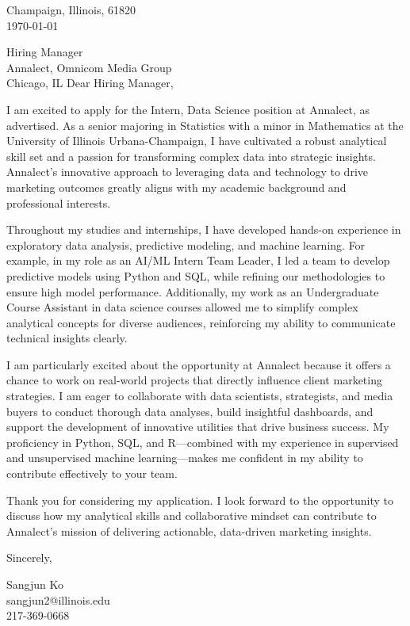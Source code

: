 \documentclass[11pt]{article}
\begin{document}
\noindent
Champaign, Illinois, 61820 \\
\today
\vspace{2em}

\noindent
Hiring Manager\\
Annalect, Omnicom Media Group\\
Chicago, IL
\vspace{1.5em}
Dear Hiring Manager,

I am excited to apply for the Intern, Data Science position at Annalect, as advertised. As a senior majoring in Statistics with a minor in Mathematics at the University of Illinois Urbana-Champaign, I have cultivated a robust analytical skill set and a passion for transforming complex data into strategic insights. Annalect’s innovative approach to leveraging data and technology to drive marketing outcomes greatly aligns with my academic background and professional interests.

Throughout my studies and internships, I have developed hands-on experience in exploratory data analysis, predictive modeling, and machine learning. For example, in my role as an AI/ML Intern Team Leader, I led a team to develop predictive models using Python and SQL, while refining our methodologies to ensure high model performance. Additionally, my work as an Undergraduate Course Assistant in data science courses allowed me to simplify complex analytical concepts for diverse audiences, reinforcing my ability to communicate technical insights clearly.

I am particularly excited about the opportunity at Annalect because it offers a chance to work on real-world projects that directly influence client marketing strategies. I am eager to collaborate with data scientists, strategists, and media buyers to conduct thorough data analyses, build insightful dashboards, and support the development of innovative utilities that drive business success. My proficiency in Python, SQL, and R—combined with my experience in supervised and unsupervised machine learning—makes me confident in my ability to contribute effectively to your team.

Thank you for considering my application. I look forward to the opportunity to discuss how my analytical skills and collaborative mindset can contribute to Annalect’s mission of delivering actionable, data-driven marketing insights.

\vspace{1em}

Sincerely,

\vspace{2em}

\noindent
Sangjun Ko\\
sangjun2@illinois.edu\\
217-369-0668
\end{document}
